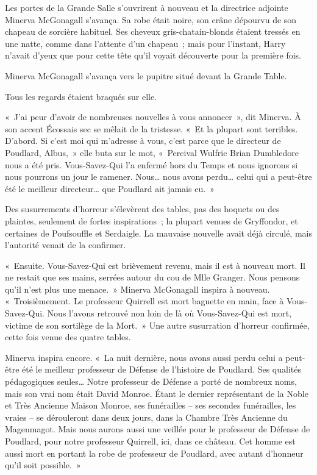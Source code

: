 Les portes de la Grande Salle s'ouvrirent à nouveau et la directrice adjointe Minerva McGonagall s'avança.
Sa robe était noire, son crâne dépourvu de son chapeau de sorcière habituel.
Ses cheveux gris-chatain-blonds étaient tressés en une natte, comme dans l'attente d'un chapeau~; mais pour l'instant, Harry n'avait d'yeux que pour cette tête qu'il voyait découverte pour la première fois.

Minerva McGonagall s'avança vers le pupitre situé devant la Grande Table.

Tous les regards étaient braqués sur elle.

«~J'ai peur d'avoir de nombreuses nouvelles à vous annoncer~», dit Minerva.
À son accent Écossais sec se mêlait de la tristesse.
«~Et la plupart sont terribles.
D'abord.
Si c'est moi qui m'adresse à vous, c'est parce que le directeur de Poudlard, Albus,~» elle buta sur le mot, «~Percival Wulfric Brian Dumbledore nous a été pris.
Vous-Savez-Qui l'a enfermé hors du Temps et nous ignorons si nous pourrons un jour le ramener.
Nous… nous avons perdu… celui qui a peut-être été le meilleur directeur… que Poudlard ait jamais eu.~»

Des susurrements d'horreur s'élevèrent des tables, pas des hoquets ou des plaintes, seulement de fortes inspirations~; la plupart venues de Gryffondor, et certaines de Poufsouffle et Serdaigle.
La mauvaise nouvelle avait déjà circulé, mais l'autorité venait de la confirmer.

«~Ensuite.
Vous-Savez-Qui est brièvement revenu, mais il est à nouveau mort.
Il ne restait que ses mains, serrées autour du cou de Mlle Granger.
Nous pensons qu'il n'est plus une menace.~»
Minerva McGonagall inspira à nouveau.
«~Troisièmement.
Le professeur Quirrell est mort baguette en main, face à Vous-Savez-Qui.
Nous l'avons retrouvé non loin de là où Vous-Savez-Qui est mort, victime de son sortilège de la Mort.~»
Une autre susurration d'horreur confirmée, cette fois venue des quatre tables.

Minerva inspira encore.
«~La nuit dernière, nous avons aussi perdu celui a peut-être été le meilleur professeur de Défense de l'histoire de Poudlard.
Ses qualités pédagogiques seules…
Notre professeur de Défense a porté de nombreux noms, mais son vrai nom était David Monroe.
Étant le dernier représentant de la Noble et Très Ancienne Maison Monroe, ses funérailles -- ses secondes funérailles, les vraies -- se dérouleront dans deux jours, dans la Chambre Très Ancienne du Magenmagot.
Mais nous aurons aussi une veillée pour le professeur de Défense de Poudlard, pour notre professeur Quirrell, ici, dans ce château.
Cet homme est aussi mort en portant la robe de professeur de Poudlard, avec autant d'honneur qu'il soit possible.~»

